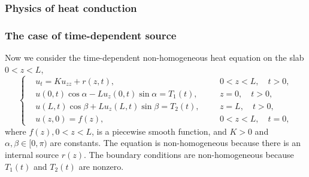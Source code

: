 \subsubsection{Physics of heat conduction}

\subsubsection{The case of time-dependent source} Now we consider the time-dependent non-homogeneous heat equation on the slab $0<z<L$,
\begin{equation}\label{eq.heat_time_dependent}
    \left\{\begin{aligned} 
        &u_t=K u_{z z} + r(z, t), && 0<z<L, \quad t>0, 
        \\ 
        &u(0, t) \cos \alpha-L u_z(0, t) \sin \alpha=T_1(t),\quad && z=0, \quad t>0, 
        \\ 
        &u(L, t) \cos \beta+L u_z(L, t) \sin \beta=T_2(t), && z=L, \quad t>0, 
        \\
        &u(z, 0)=f(z), && 0<z<L, \quad t=0,
    \end{aligned}\right.
\end{equation}
where $f(z), 0<z<L$, is a piecewise smooth function, and $K>0$ and $\alpha, \beta \in[0, \pi)$ are constants. The equation is non-homogeneous because there is an internal source $r(z)$. The boundary conditions are non-homogeneous because $T_1(t)$ and $T_2(t)$ are nonzero. 

